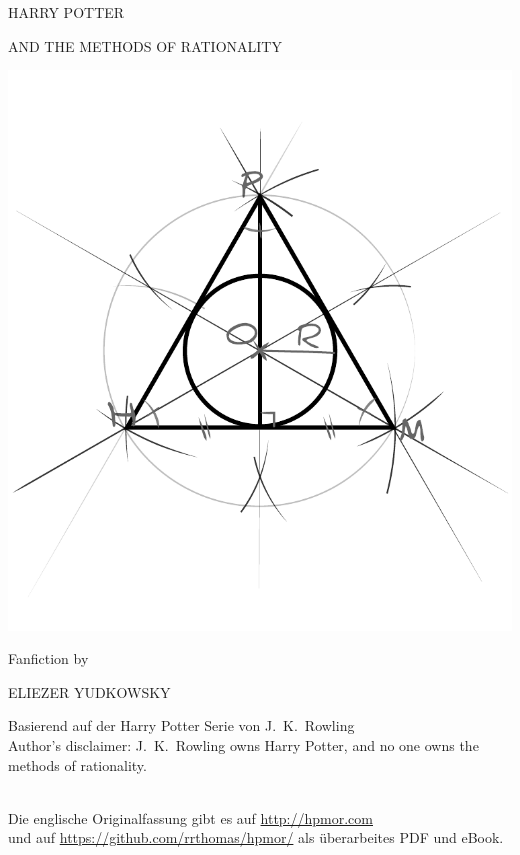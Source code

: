 \begin{center}
\thispagestyle{empty}
{\hpfont
\Huge\MakeUppercase{Harry Potter}\vspace*{0.5cm}

\Large\MakeUppercase{and the Methods of Rationality} %

\includegraphics[scale=0.5]{bubble.pdf}

\vspace*{-1.0cm}
\Large Fanfiction by \vspace*{.25cm}

\huge \MakeUppercase{Eliezer Yudkowsky}%

\normalsize

\vspace*{1\baselineskip}
\fullvolumetitle{\volumenumber}
}

\vspace{0.7cm}

Basierend auf der Harry Potter Serie von J.~K.~Rowling\\
Author's disclaimer: J.~K.~Rowling owns Harry Potter, and no one owns the methods of rationality.

~\\
Die englische Originalfassung gibt es auf {\small\url{http://hpmor.com}}\\
und auf {\small\url{https://github.com/rrthomas/hpmor/}} als überarbeites PDF und eBook.\\
\end{center}




